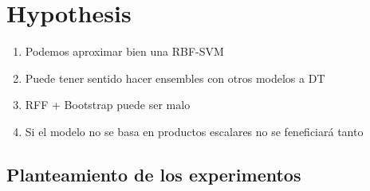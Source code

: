 \section{Hypothesis}
\begin{note}
  \begin{enumerate}
    \item Podemos aproximar bien una RBF-SVM
    \item Puede tener sentido hacer ensembles con otros modelos a DT
    \item RFF + Bootstrap puede ser malo
    \item Si el modelo no se basa en productos escalares no se
    feneficiará tanto
  \end{enumerate}
\end{note}
\begin{note}
  \subsection{Planteamiento de los experimentos}
\end{note}
